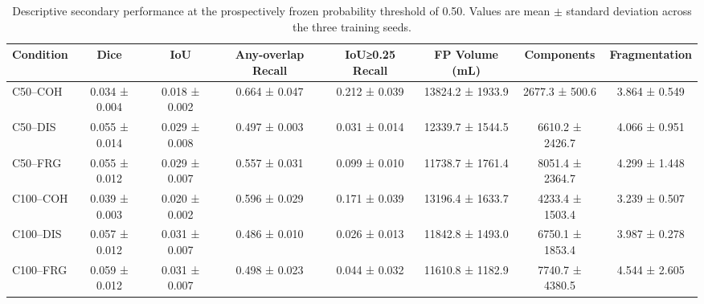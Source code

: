 \begin{table}[t]
\centering
\small
\caption{Descriptive secondary performance at the prospectively frozen probability threshold of 0.50. Values are mean $\pm$ standard deviation across the three training seeds.}
\label{tab:cova_secondary}
\begin{tabular}{lccccccc}
\toprule
Condition & Dice & IoU & Any-overlap Recall & IoU≥0.25 Recall & FP Volume (mL) & Components & Fragmentation \\
\midrule
C50–COH & 0.034 ± 0.004 & 0.018 ± 0.002 & 0.664 ± 0.047 & 0.212 ± 0.039 & 13824.2 ± 1933.9 & 2677.3 ± 500.6 & 3.864 ± 0.549 \\
C50–DIS & 0.055 ± 0.014 & 0.029 ± 0.008 & 0.497 ± 0.003 & 0.031 ± 0.014 & 12339.7 ± 1544.5 & 6610.2 ± 2426.7 & 4.066 ± 0.951 \\
C50–FRG & 0.055 ± 0.012 & 0.029 ± 0.007 & 0.557 ± 0.031 & 0.099 ± 0.010 & 11738.7 ± 1761.4 & 8051.4 ± 2364.7 & 4.299 ± 1.448 \\
C100–COH & 0.039 ± 0.003 & 0.020 ± 0.002 & 0.596 ± 0.029 & 0.171 ± 0.039 & 13196.4 ± 1633.7 & 4233.4 ± 1503.4 & 3.239 ± 0.507 \\
C100–DIS & 0.057 ± 0.012 & 0.031 ± 0.007 & 0.486 ± 0.010 & 0.026 ± 0.013 & 11842.8 ± 1493.0 & 6750.1 ± 1853.4 & 3.987 ± 0.278 \\
C100–FRG & 0.059 ± 0.012 & 0.031 ± 0.007 & 0.498 ± 0.023 & 0.044 ± 0.032 & 11610.8 ± 1182.9 & 7740.7 ± 4380.5 & 4.544 ± 2.605 \\
\bottomrule
\end{tabular}
\end{table}
